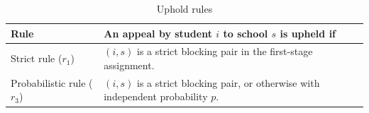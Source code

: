 \begin{table}[htbp]
\centering
\caption{Uphold rules}
\label{tab:upholdrules_rep}
\begin{tabular}{p{3.5cm}p{10cm}}
\toprule
Rule & An appeal by student \(i\) to school \(s\) is upheld if \\
\midrule
Strict rule (\(r_1\)) & \((i,s)\) is a strict blocking pair in the first-stage assignment. \\
Probabilistic rule (\(r_3\)) & \((i,s)\) is a strict blocking pair, or otherwise with independent probability \(p\). \\
\bottomrule
\end{tabular}
\end{table}
